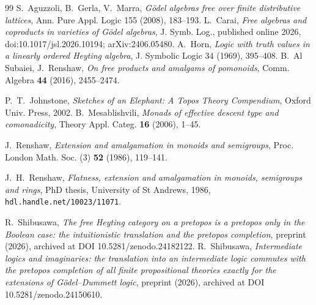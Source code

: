 \documentclass[11pt]{amsart}
\theoremstyle{definition}
\begin{document}
\begin{thebibliography}{99}
 S.~Aguzzoli, B.~Gerla, V.~Marra, \emph{G\"odel algebras
free over finite distributive lattices}, Ann. Pure Appl. Logic 155
(2008), 183--193.
 L.~Carai, \emph{Free algebras and coproducts in
varieties of G\"odel algebras}, J. Symb. Log., published online 2026,
doi:10.1017/jsl.2026.10194; arXiv:2406.05480.
 A.~Horn, \emph{Logic with truth values in a linearly
ordered Heyting algebra}, J. Symbolic Logic 34 (1969), 395--408.
 B.~Al Subaiei, J.~Renshaw, \emph{On free
products and amalgams of pomonoids}, Comm. Algebra \textbf{44} (2016),
2455--2474.

 P.~T.~Johnstone, \emph{Sketches of an Elephant: A Topos
Theory Compendium}, Oxford Univ. Press, 2002.
 B.~Mesablishvili, \emph{Monads of effective
descent type and comonadicity}, Theory Appl. Categ. \textbf{16}
(2006), 1--45.

 J.~Renshaw, \emph{Extension and amalgamation in
monoids and semigroups}, Proc. London Math. Soc. (3) \textbf{52}
(1986), 119--141.

 J.~H.~Renshaw, \emph{Flatness, extension and
amalgamation in monoids, semigroups and rings}, PhD thesis, University
of St Andrews, 1986, \texttt{hdl.handle.net/10023/11071}.

 R.~Shibusawa, \emph{The free Heyting category on a
pretopos is a pretopos only in the Boolean case: the intuitionistic
translation and the pretopos completion}, preprint (2026), archived at
DOI 10.5281/zenodo.24182122.
 R.~Shibusawa, \emph{Intermediate logics and
imaginaries: the translation into an intermediate logic commutes with
the pretopos completion of all finite propositional theories exactly
for the extensions of G\"odel--Dummett logic}, preprint (2026),
archived at DOI 10.5281/zenodo.24150610.
\end{thebibliography}
\end{document}
